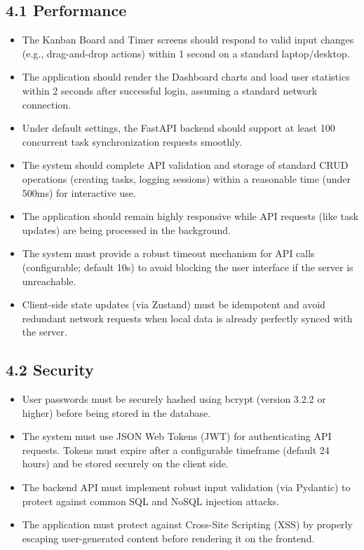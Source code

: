 \documentclass[12pt]{article}
\begin{document}
\subsection*{4.1 Performance}
\begin{itemize}
    \item The Kanban Board and Timer screens should respond to valid input changes (e.g., drag-and-drop actions) within 1 second on a standard laptop/desktop.
    \item The application should render the Dashboard charts and load user statistics within 2 seconds after successful login, assuming a standard network connection.
    \item Under default settings, the FastAPI backend should support at least 100 concurrent task synchronization requests smoothly.
    \item The system should complete API validation and storage of standard CRUD operations (creating tasks, logging sessions) within a reasonable time (under 500ms) for interactive use.
    \item The application should remain highly responsive while API requests (like task updates) are being processed in the background.
    \item The system must provide a robust timeout mechanism for API calls (configurable; default 10s) to avoid blocking the user interface if the server is unreachable.
    \item Client-side state updates (via Zustand) must be idempotent and avoid redundant network requests when local data is already perfectly synced with the server.
\end{itemize}

\vspace{0.5cm}
\subsection*{4.2 Security}
\begin{itemize}
    \item User passwords must be securely hashed using bcrypt (version 3.2.2 or higher) before being stored in the database.
    \item The system must use JSON Web Tokens (JWT) for authenticating API requests. Tokens must expire after a configurable timeframe (default 24 hours) and be stored securely on the client side.
    \item The backend API must implement robust input validation (via Pydantic) to protect against common SQL and NoSQL injection attacks.
    \item The application must protect against Cross-Site Scripting (XSS) by properly escaping user-generated content before rendering it on the frontend.
\end{itemize}
\end{document}
